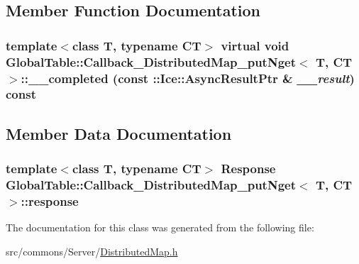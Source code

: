 \subsection{Member Function Documentation}
\hypertarget{class_global_table_1_1_callback___distributed_map__put_nget_a41d8c24bfa34d63f0ad78437cfbe5d45}{
\subsubsection[{\_\-\_\-completed}]{\setlength{\rightskip}{0pt plus 5cm}template$<$class T, typename CT$>$ virtual void {\bf GlobalTable::Callback\_\-DistributedMap\_\-putNget}$<$ T, CT $>$::\_\-\_\-completed (const ::Ice::AsyncResultPtr \& {\em \_\-\_\-result}) const}}
\label{class_global_table_1_1_callback___distributed_map__put_nget_a41d8c24bfa34d63f0ad78437cfbe5d45}


\subsection{Member Data Documentation}
\hypertarget{class_global_table_1_1_callback___distributed_map__put_nget_af25c8b9d7ac55cc8a5df907bc0dab9ad}{
\subsubsection[{response}]{\setlength{\rightskip}{0pt plus 5cm}template$<$class T, typename CT$>$ {\bf Response} {\bf GlobalTable::Callback\_\-DistributedMap\_\-putNget}$<$ T, CT $>$::{\bf response}}}
\label{class_global_table_1_1_callback___distributed_map__put_nget_af25c8b9d7ac55cc8a5df907bc0dab9ad}


The documentation for this class was generated from the following file:\begin{DoxyCompactItemize}
\item 
src/commons/Server/\hyperlink{_distributed_map_8h}{DistributedMap.h}\end{DoxyCompactItemize}
